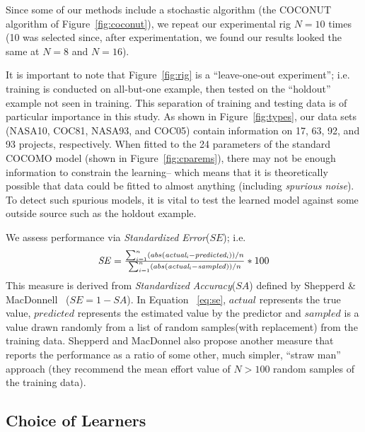 \documentclass[smallcondesed]{svjour3}
\newcommand{\fig}[1]{Figure~\ref{fig:#1}}
\newenvironment{changed}{\par}{\par}
\begin{document}
Since some of our methods include a stochastic
algorithm (the COCONUT algorithm of \fig{coconut}),
we repeat our experimental rig   $N=10$ times
(10 was selected since, after experimentation, we
found our results looked the same at $N=8$ and
$N=16$).



\begin{changed}
It is important to note that Figure~\ref{fig:rig} is a ``leave-one-out experiment''; i.e.
training is conducted on all-but-one example, then tested
on the ``holdout'' example not seen in training. This separation of training and testing
data is of particular
importance in this study. 
As shown in \fig{types}, our  data sets (NASA10, COC81, NASA93, and COC05)
contain information on 17, 63, 92, and 93  projects, respectively. When fitted to
the   24 parameters of the standard COCOMO model  (shown in \fig{cparems}),
there may not be enough information to constrain the learning-- which means that it is theoretically
possible that data could be fitted to almost anything (including {\em spurious noise}).
To detect such spurious models, it is vital to test the learned model against some
outside source such as the holdout example.
\end{changed} 

We assess  
performance via {\em Standardized Error}($SE$); i.e.
\begin{equation}\label{eq:se}
\mbox{$ \mathit{SE}=\frac{\sum_{i=1}^{n}(abs(\mathit{actual_i} - \mathit{predicted_i}))/n}{\sum_{i=1}^{n}(abs(\mathit{actual_i} - \mathit{sampled}))/n}$} * 100
\end{equation}
This measure is derived from {\em Standardized Accuracy}($SA$) defined by Shepperd \& MacDonnell~\cite{shepperd12a} ($SE = 1 - SA$). In Equation ~\ref{eq:se}, $actual$ represents the true value, $predicted$ represents the estimated value by the predictor and $sampled$ is a value drawn randomly from a list of random samples(with replacement) from the training data.  Shepperd and MacDonnel also propose
another measure that reports the performance as a
ratio of some other, much
simpler, ``straw man'' approach (they recommend the
mean effort value of $N>100$ random samples of the
training data).  
 

\subsection{Choice of Learners}\label{sect:whatlearn}
\end{document}
